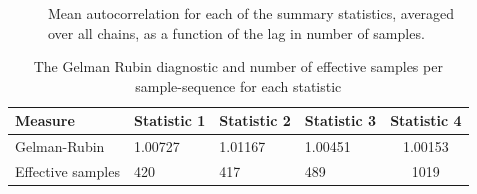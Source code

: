 \documentclass{article}
\begin{document}
\begin{figure}
	\centering
	\caption{Mean autocorrelation for each of the summary statistics, averaged over all chains, as a function of the lag in number of samples.}
	\label{figAutocorrelation}
\end{figure}

\begin{table}
	\begin{center}
		\begin{tabular}{llllc}
			\hline
			Measure & Statistic 1 & Statistic 2 & Statistic 3 & Statistic 4\\
			\hline
			Gelman-Rubin & 1.00727 & 1.01167 & 1.00451 & 1.00153  \\
			Effective samples & 420 & 417 & 489 & 1019 \\
			\hline
		\end{tabular}
	\end{center}
	\caption{The Gelman Rubin diagnostic and number of effective samples per sample-sequence for each statistic}
	\label{convergenceResults}
\end{table}
\end{document}
